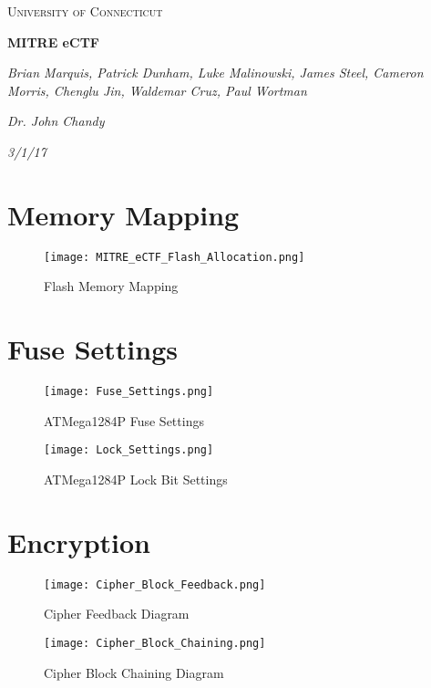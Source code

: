 \documentclass[11pt]{article}
\begin{document}
\begin{titlepage}
	\centering
	\vspace{1cm}
	{\scshape\Large University of Connecticut\par}
	\vspace{1.5cm}
	{\huge\bfseries MITRE eCTF\par}
	\vspace{2cm}
	{\Large\itshape Brian Marquis, Patrick Dunham, Luke Malinowski, James Steel, Cameron Morris, Chenglu Jin, Waldemar Cruz, Paul Wortman\par}
	{\Large\itshape Dr. John Chandy\par}
    {\Large\itshape 3/1/17\par}
\tableofcontents
\vfill
\end{titlepage}
\section{Memory Mapping}
\begin{figure}[!h]
\begin{center}
\texttt{[image: MITRE\_eCTF\_Flash\_Allocation.png]}
\caption{Flash Memory Mapping}
\end{center}
\end{figure}
\section{Fuse Settings}
\begin{figure}[!h]
\begin{center}
\texttt{[image: Fuse\_Settings.png]}
\caption{ATMega1284P Fuse Settings}
\end{center}
\end{figure}
\begin{figure}[!h]
\begin{center}
\texttt{[image: Lock\_Settings.png]}
\caption{ATMega1284P Lock Bit Settings}
\end{center}
\end{figure}
\section{Encryption}
\begin{figure}[!h]
\begin{center}
\texttt{[image: Cipher\_Block\_Feedback.png]}
\caption{Cipher Feedback Diagram}
\end{center}
\end{figure}
\begin{figure}[!h]
\begin{center}
\texttt{[image: Cipher\_Block\_Chaining.png]}
\caption{Cipher Block Chaining Diagram}
\end{center}
\end{figure}
\end{document}
